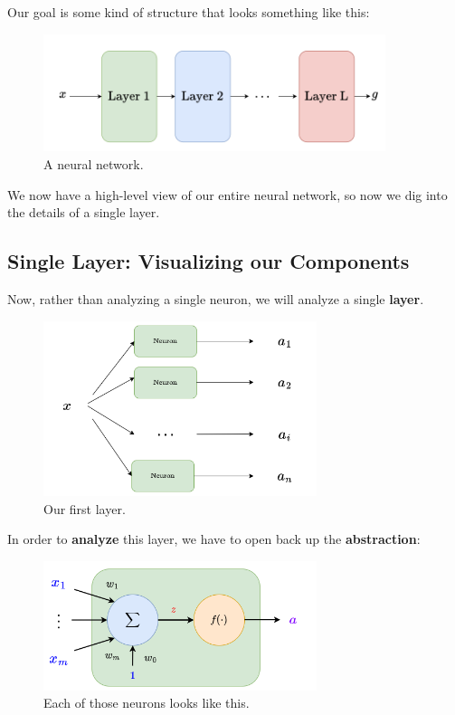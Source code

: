         Our goal is some kind of structure that looks something like this:
        
        \begin{figure}[H]
            \centering
            \includegraphics[width=100mm,scale=0.4]{images/nn_images/layers.png}
            \caption*{A neural network.}
        \end{figure}
        
        We now have a high-level view of our entire neural network, so now we dig into the details of a single layer.
        
        
    \subsection{Single Layer: Visualizing our Components}
    
        Now, rather than analyzing a single neuron, we will analyze a single \textbf{layer}.
        
        \begin{figure}[H]
            \centering
            \includegraphics[width=80mm,scale=0.4]{images/nn_images/general_layer.png}
            \caption*{Our first layer.}
        \end{figure}
        
        In order to \textbf{analyze} this layer, we have to open back up the \textbf{abstraction}:
        
        \begin{figure}[H]
            \centering
            \includegraphics[width=80mm,scale=0.4]{images/nn_images/neuron_inside.png}
            \caption*{Each of those neurons looks like this.}
        \end{figure}
        
